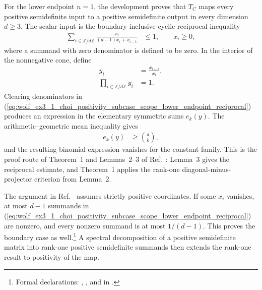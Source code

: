 \documentclass{article}
\begin{document}
For the lower endpoint $n=1$, the development proves that $T_C$ maps every
positive semidefinite input to a positive semidefinite output in every
dimension $d\geq 3$. The scalar input is the boundary-inclusive cyclic
reciprocal inequality
\begin{align}
    \sum_{i\in\mathbb Z/d\mathbb Z}
        \frac{x_i}{(d-1)x_i+x_{i-1}}
        &\leq 1,
    \qquad x_i\geq 0,
    \label{eq:wolf_ex3_1_choi_positivity_subcase_scope_lower_endpoint_reciprocal}
\end{align}
where a summand with zero denominator is defined to be zero. In the interior
of the nonnegative cone, define
\begin{align}
    y_i
        &=\frac{x_{i-1}}{x_i},
    \label{eq:wolf_ex3_1_choi_positivity_subcase_scope_ratio_definition}\\
    \prod_{i\in\mathbb Z/d\mathbb Z}y_i
        &=1.
    \label{eq:wolf_ex3_1_choi_positivity_subcase_scope_ratio_product}
\end{align}
Clearing denominators in
(\ref{eq:wolf_ex3_1_choi_positivity_subcase_scope_lower_endpoint_reciprocal})
produces an expression in the elementary symmetric sums $e_k(y)$. The
arithmetic--geometric mean inequality gives
\begin{align}
    e_k(y)
        &\geq \binom{d}{k},
    \label{eq:wolf_ex3_1_choi_positivity_subcase_scope_symmetric_sum_bound}
\end{align}
and the resulting binomial expression vanishes for the constant family. This
is the proof route of Theorem~1 and Lemmas~2--3 of
Ref.~\cite[pp.~309--311]{TanahashiTomiyama1988Indecomposable}: Lemma~3 gives
the reciprocal estimate, and Theorem~1 applies the rank-one
diagonal-minus-projector criterion from Lemma~2.

The argument in
Ref.~\cite[pp.~309--311]{TanahashiTomiyama1988Indecomposable} assumes strictly
positive coordinates. If some $x_i$ vanishes, at most $d-1$ summands in
(\ref{eq:wolf_ex3_1_choi_positivity_subcase_scope_lower_endpoint_reciprocal})
are nonzero, and every nonzero summand is at most $1/(d-1)$. This proves the
boundary case as well.\footnote{Formal declarations:
,
, and
 in
.}
A spectral decomposition of a positive semidefinite matrix into rank-one
positive semidefinite summands then extends the rank-one result to positivity
of the map.
\end{document}
